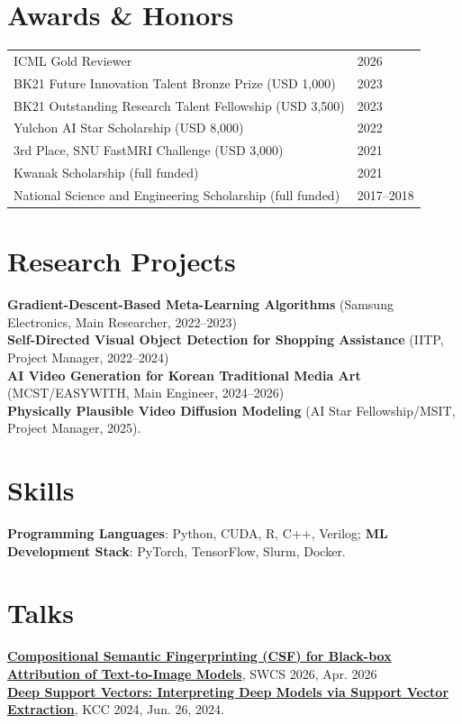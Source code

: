 \documentclass[10pt, letterpaper]{article}
\begin{document}
\section{Awards \& Honors}
{\small
\begin{tabu} to 0.97\textwidth { X[0.8,l] X[0.2,r] }
    ICML Gold Reviewer & 2026 \\
    BK21 Future Innovation Talent Bronze Prize (USD 1,000) & 2023 \\
    BK21 Outstanding Research Talent Fellowship (USD 3,500) & 2023 \\
    Yulchon AI Star Scholarship (USD 8,000) & 2022 \\
    3rd Place, SNU FastMRI Challenge (USD 3,000) & 2021 \\
    Kwanak Scholarship (full funded) & 2021 \\
    National Science and Engineering Scholarship (full funded) & 2017--2018
\end{tabu}
}

\section{Research Projects}
{\small
\textbf{Gradient-Descent-Based Meta-Learning Algorithms} (Samsung Electronics, Main Researcher, 2022--2023)\\
\textbf{Self-Directed Visual Object Detection for Shopping Assistance} (IITP, Project Manager, 2022--2024)\\
\textbf{AI Video Generation for Korean Traditional Media Art} (MCST/EASYWITH, Main Engineer, 2024--2026)\\
\textbf{Physically Plausible Video Diffusion Modeling} (AI Star Fellowship/MSIT, Project Manager, 2025).
}

\section{Skills}
{\small
\textbf{Programming Languages}: Python, CUDA, R, C++, Verilog; \textbf{ML Development Stack}: PyTorch, TensorFlow, Slurm, Docker.
}

\section{Talks}
{\small
\textbf{\href{https://junhoo.me/csf}{Compositional Semantic Fingerprinting (CSF) for Black-box Attribution of Text-to-Image Models}}, SWCS 2026, Apr. 2026\\
\textbf{\href{https://arxiv.org/abs/2403.17329}{Deep Support Vectors: Interpreting Deep Models via Support Vector Extraction}}, KCC 2024, Jun. 26, 2024.
}
\end{document}
